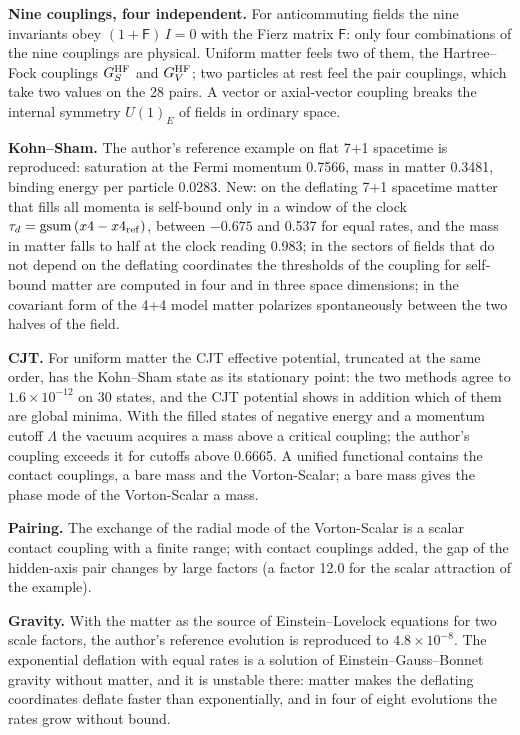 \documentclass[
  10pt,
]{article}
\begin{document}
\textbf{Nine couplings, four independent.} For anticommuting fields the
nine invariants obey \((1+\mathsf F)\,I=0\) with the Fierz matrix
\(\mathsf F\): only four combinations of the nine couplings are
physical. Uniform matter feels two of them, the Hartree--Fock couplings
\(G_S^{\rm HF}\) and \(G_V^{\rm HF}\); two particles at rest feel the
pair couplings, which take two values on the 28 pairs. A vector or
axial-vector coupling breaks the internal symmetry \(U(1)_E\) of fields
in ordinary space.

\textbf{Kohn--Sham.} The author's reference example on flat 7+1
spacetime is reproduced: saturation at the Fermi momentum 0.7566, mass
in matter 0.3481, binding energy per particle 0.0283. New: on the
deflating 7+1 spacetime matter that fills all momenta is self-bound only
in a window of the clock \(\tau_d=\mathrm{gsum}\,(x4-x4_{\rm ref})\),
between \(-0.675\) and 0.537 for equal rates, and the mass in matter
falls to half at the clock reading 0.983; in the sectors of fields that
do not depend on the deflating coordinates the thresholds of the
coupling for self-bound matter are computed in four and in three space
dimensions; in the covariant form of the 4+4 model matter polarizes
spontaneously between the two halves of the field.

\textbf{CJT.} For uniform matter the CJT effective potential, truncated
at the same order, has the Kohn--Sham state as its stationary point: the
two methods agree to \(1.6\times10^{-12}\) on 30 states, and the CJT
potential shows in addition which of them are global minima. With the
filled states of negative energy and a momentum cutoff \(\Lambda\) the
vacuum acquires a mass above a critical coupling; the author's coupling
exceeds it for cutoffs above 0.6665. A unified functional contains the
contact couplings, a bare mass and the Vorton-Scalar; a bare mass gives
the phase mode of the Vorton-Scalar a mass.

\textbf{Pairing.} The exchange of the radial mode of the Vorton-Scalar
is a scalar contact coupling with a finite range; with contact couplings
added, the gap of the hidden-axis pair changes by large factors (a
factor 12.0 for the scalar attraction of the example).

\textbf{Gravity.} With the matter as the source of Einstein--Lovelock
equations for two scale factors, the author's reference evolution is
reproduced to \(4.8\times10^{-8}\). The exponential deflation with equal
rates is a solution of Einstein--Gauss--Bonnet gravity without matter,
and it is unstable there: matter makes the deflating coordinates deflate
faster than exponentially, and in four of eight evolutions the rates
grow without bound.
\end{document}
